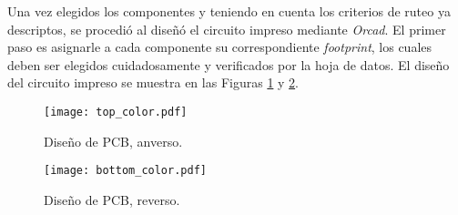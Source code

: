 Una vez elegidos los componentes y teniendo en cuenta los criterios de ruteo ya descriptos, se procedió al diseñó el circuito impreso mediante \textit{Orcad}. El primer paso es asignarle a cada componente su correspondiente \textit{footprint}, los cuales deben ser elegidos cuidadosamente y verificados por la hoja de datos. El diseño del circuito impreso se muestra en las Figuras \ref{fig.pcb_top} y \ref{fig.pcb_bottom}. 

\begin{figure}[H]
	\centering
	\texttt{[image: top\_color.pdf]}
	\caption{Diseño de PCB, anverso.}
	\label{fig.pcb_top}
\end{figure}

\begin{figure}[H]
	\centering
	\texttt{[image: bottom\_color.pdf]}
	\caption{Diseño de PCB, reverso.}
	\label{fig.pcb_bottom}
\end{figure}

